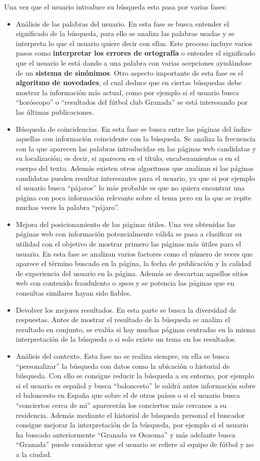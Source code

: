 \documentclass[size=a4, parskip=half, titlepage=false, toc=flat, toc=bib, 12pt]{scrartcl}
\theoremstyle{theorem-style}
\theoremstyle{definition-style}
\theoremstyle{remark-style}
\theoremstyle{example-style}
\theoremstyle{definition-style}
\theoremstyle{remark-style}
\begin{document}
Una vez que el usuario introduce su búsqueda esta pasa por varias fases:
\begin{itemize}
\item Análisis de las palabras del usuario. En esta fase se busca entender el significado de la búsqueda, para ello se analiza las palabras usadas y se interpreta lo que el usuario quiere decir con ellas. Este proceso incluye varios pasos como \textbf{interpretar los errores de ortografía} o entender el significado que el usuario le está dando a una palabra con varias acepciones ayudándose de un \textbf{sistema de sinónimos}. Otro aspecto importante de esta fase es el \textbf{algoritmo de novedades}, el cual deduce que en ciertas búsquedas debe mostrar la información más actual, como por ejemplo si el usuario busca ``horóscopo'' o ``resultados del fútbol club Granada'' se está interesando por las últimas publicaciones.
\item Búsqueda de coincidencias. En esta fase se busca entre las páginas del índice aquellas con información coincidente con la búsqueda. Se analiza la frecuencia con la que aparecen las palabras introducidas en las páginas web candidatas y su localización; es decir, si aparecen en el título, encabezamientos o en el cuerpo del texto. Además existen otros algoritmos que analizan si las páginas candidatas pueden resultar interesantes para el usuario, ya que si por ejemplo el usuario busca ``pájaros'' lo más probable es que no quiera encontrar una página con poca información relevante sobre el tema pero en la que se repite muchas veces la palabra ``pájaro''.
\item Mejora del posicionamiento de las páginas útiles. Una vez obtenidas las páginas web con información potencialmente válida se pasa a clasificar su utilidad con el objetivo de mostrar primero las páginas más útiles para el usuario. En esta fase se analizan varios factores como el número de veces que aparece el término buscado en la página, la fecha de publicación y la calidad de experiencia del usuario en la página. Además se descartan aquellos sitios web con contenido fraudulento o \textit{spam} y se potencia las páginas que en consultas similares hayan sido fiables.
\item Devolver los mejores resultados. En esta parte se busca la diversidad de respuestas. Antes de mostrar el resultado de la búsqueda se analiza el resultado en conjunto, se evalúa si hay muchas páginas centradas en la misma interpretación de la búsqueda o si solo existe un tema en los resultados.
\item Análisis del contexto. Esta fase no se realiza siempre, en ella se busca ``personalizar'' la búsqueda con datos como la ubicación o historial de búsqueda. Con ello se consigue reducir la búsqueda a su entorno, por ejemplo si el usuario es español y busca ``baloncesto'' le saldrá antes información sobre el baloncesto en España que sobre el de otros países o si el usuario busca ``conciertos cerca de mi'' aparecerán los conciertos más cercanos a su residencia. Además mediante el historial de búsqueda personal el buscador consigue mejorar la interpretación de la búsqueda, por ejemplo si el usuario ha buscado anteriormente ``Granada vs Osasuna'' y más adelante busca ``Granada'' puede considerar que el usuario se refiere al equipo de fútbol y no a la ciudad.

\end{itemize}
\end{document}
